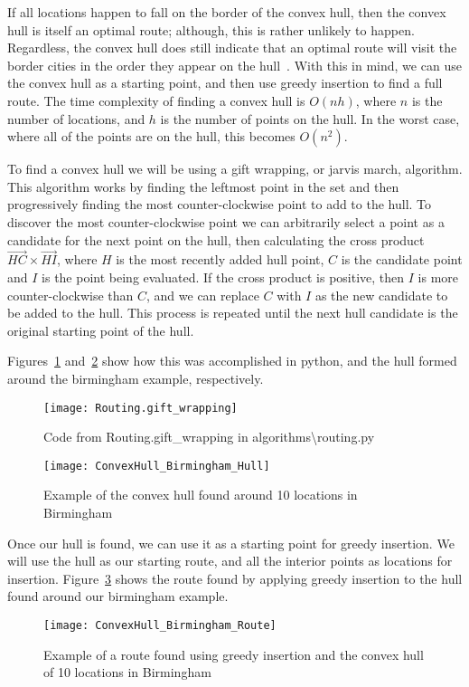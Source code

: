 \noindent
If all locations happen to fall on the border of the convex hull, then the convex hull is itself an optimal route;
although, this is rather unlikely to happen.
Regardless, the convex hull does still indicate that an optimal route will visit the border cities in the order they
appear on the hull~\parencite[p. 46]{applegate2006traveling}.
With this in mind, we can use the convex hull as a starting point, and then use greedy insertion to find a full route.
The time complexity of finding a convex hull is $O(nh)$, where $n$ is the number of locations, and $h$ is the number
of points on the hull. In the worst case, where all of the points are on the hull, this becomes $O(n^2)$.

To find a convex hull we will be using a gift wrapping, or jarvis march, algorithm.
This algorithm works by finding the leftmost point in the set and then progressively finding the most counter-clockwise
point to add to the hull.
To discover the most counter-clockwise point we can arbitrarily select a point as a candidate for the next point on
the hull, then calculating the cross product $\vec{HC} \times \vec{HI}$, where $H$ is the most recently added hull
point, $C$ is the candidate point and $I$ is the point being evaluated.
If the cross product is positive, then $I$ is more counter-clockwise than $C$, and we can replace $C$ with $I$ as
the new candidate to be added to the hull.
This process is repeated until the next hull candidate is the original starting point of the hull.

Figures~\ref{fig:Routing.gift_wrapping} and~\ref{fig:ConvexHull_Birmingham_Hull} show how this was accomplished in
python, and the hull formed around the birmingham example, respectively.
\begin{figure}[H]
    \centering
    \texttt{[image: Routing.gift\_wrapping]}
    \caption{Code from Routing.gift\_wrapping in algorithms\textbackslash routing.py}
    \label{fig:Routing.gift_wrapping}
\end{figure}
\begin{figure}[H]
    \centering
    \texttt{[image: ConvexHull\_Birmingham\_Hull]}
    \caption{Example of the convex hull found around 10 locations in Birmingham}
    \label{fig:ConvexHull_Birmingham_Hull}
\end{figure}

\noindent
Once our hull is found, we can use it as a starting point for greedy insertion.
We will use the hull as our starting route, and all the interior points as locations for insertion.
Figure~\ref{fig:ConvexHull_Birmingham_Route} shows the route found by applying greedy insertion to the hull found
around our birmingham example.
\begin{figure}[H]
    \centering
    \texttt{[image: ConvexHull\_Birmingham\_Route]}
    \caption{Example of a route found using greedy insertion and the convex hull of 10 locations in Birmingham}
    \label{fig:ConvexHull_Birmingham_Route}
\end{figure}

